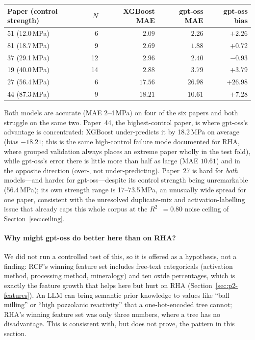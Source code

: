\documentclass[11pt]{article}
\newcommand{\R}{$R^2$}
\begin{document}
\begin{center}\small
\begin{tabular}{lrrrr}
\toprule
Paper (control strength) & $N$ & XGBoost MAE & gpt-oss MAE & gpt-oss bias \\
\midrule
51 (12.0\,MPa) & 6 & $2.09$ & $2.26$ & $+2.26$ \\
81 (18.7\,MPa) & 9 & $2.69$ & $\mathbf{1.88}$ & $+0.72$ \\
37 (29.1\,MPa) & 12 & $2.96$ & $2.40$ & $-0.93$ \\
19 (40.0\,MPa) & 14 & $2.88$ & $3.79$ & $+3.79$ \\
27 (56.4\,MPa) & 6 & $17.56$ & $26.98$ & $+26.98$ \\
44 (87.3\,MPa) & 9 & $\mathbf{18.21}$ & $\mathbf{10.61}$ & $+7.28$ \\
\bottomrule
\end{tabular}
\end{center}

\noindent Both models are accurate (MAE 2--4\,MPa) on four of the six papers and both
struggle on the same two. Paper~44, the highest-control paper, is where gpt-oss's
advantage is concentrated: XGBoost under-predicts it by 18.2\,MPa on average (bias
$-18.21$; this is the same high-control failure mode documented for RHA, where grouped
validation always places an extreme paper wholly in the test fold), while gpt-oss's
error there is little more than half as large (MAE $10.61$) and in the opposite
direction (over-, not under-predicting). Paper~27 is hard for \emph{both} models---and
harder for gpt-oss---despite its control strength being unremarkable (56.4\,MPa); its
own strength range is 17--73.5\,MPa, an unusually wide spread for one paper, consistent
with the unresolved duplicate-mix and activation-labelling issue that already caps this
whole corpus at the \R{}~$=0.80$ noise ceiling of Section~\ref{sec:ceiling}.

\paragraph{Why might gpt-oss do better here than on RHA?} We did not run a controlled
test of this, so it is offered as a hypothesis, not a finding: RCF's winning feature set
includes free-text categoricals (activation method, processing method, mineralogy) and
ten oxide percentages, which is exactly the feature growth that helps here but hurt on
RHA (Section~\ref{sec:p2-features}). An LLM can bring semantic prior knowledge to values
like ``ball milling'' or ``high pozzolanic reactivity'' that a one-hot-encoded tree
cannot; RHA's winning feature set was only three numbers, where a tree has no
disadvantage. This is consistent with, but does not prove, the pattern in this section.
\end{document}
